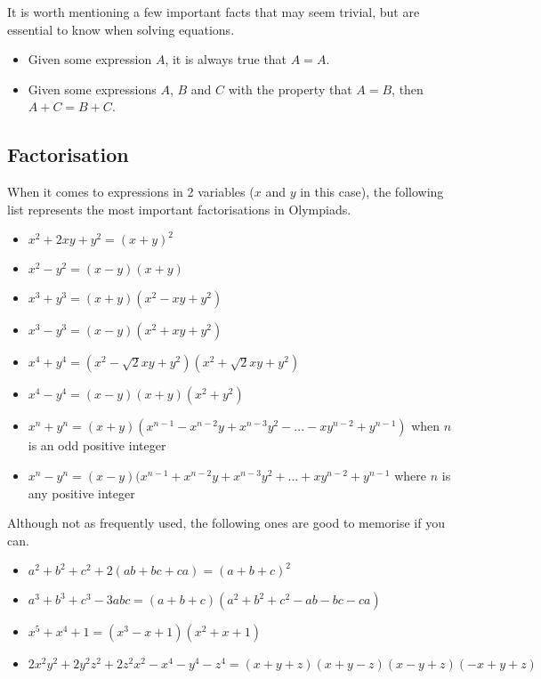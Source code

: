 \documentclass[a4paper,12pt]{article}
\begin{document}
It is worth mentioning a few important facts that may seem trivial, but are essential to know when solving equations.
\begin{itemize}
\item Given some expression $A$, it is always true that $A = A$.
\item Given some expressions $A$, $B$ and $C$ with the property that $A = B$, then $A + C = B + C$.
\end{itemize}

\subsection{Factorisation}
When it comes to expressions in 2 variables ($x$ and $y$ in this case), the following list represents the most important factorisations in Olympiads.

\begin{itemize}

\item $x^2 + 2xy + y^2 = (x + y) ^ 2$ 
\item $x^2 - y^2 = (x - y)(x + y)$
\item $x^3 + y^3 = (x + y)(x^2 - xy + y^2)$
\item $x^3 - y^3 = (x - y)(x^2 + xy + y^2)$
\item $x^4 + y^4 = (x^2 - \sqrt{2}xy + y^2)(x^2 + \sqrt{2}xy + y^2)$
\item $x^4 - y^4 = (x - y)(x + y)(x^2 + y^2)$
\item $x^n + y^n = (x + y)(x^{n - 1} - x^{n - 2}y + x^{n - 3}y^2 - ... - xy^{n - 2} + y^{n - 1})$ when $n$ is an odd positive integer
\item $x^n - y^n = (x - y)(x^{n - 1} + x^{n - 2}y + x^{n - 3}y^2 + ... + xy^{n - 2} + y^{n - 1}$ where $n$ is any positive integer

\end{itemize}

Although not as frequently used, the following ones are good to memorise if you can.

\begin{itemize}

\item $a^2 + b^2 + c^2 + 2(ab + bc + ca) = (a + b + c)^2$
\item $a^3 + b^3 + c^3 - 3abc = (a + b + c)(a^2 + b^2 + c^2 - ab - bc - ca)$
\item $x^5 + x^4 + 1 = (x^3 - x + 1)(x^2 + x + 1)$
\item $2x^2y^2 + 2y^2z^2 + 2z^2x^2 - x^4 - y^4 - z^4 = (x + y + z)(x + y - z)(x - y + z)(-x + y + z)$

\end{itemize}
\end{document}
